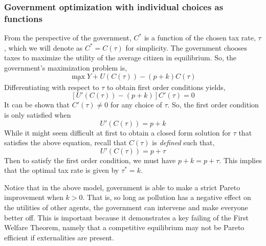 \subsubsection*{Government optimization with individual choices as functions}
From the perspective of the government, $C^*$ is a function of the chosen tax rate, $\tau$, which we will denote as $C^* = C(\tau)$ for simplicity. The government chooses taxes to maximize the utility of the average citizen in equilibrium. So, the government's maximization problem is,
\begin{equation*}
    \max_{\tau} Y + U(C(\tau)) - (p + k) C(\tau)
\end{equation*}
Differentiating with respect to $\tau$ to obtain first order conditions yields,
\begin{equation*}
    \left[U'(C(\tau)) - (p + k)\right]C'(\tau) = 0
\end{equation*}
It can be shown that $C'(\tau) \neq 0$ for any choice of $\tau$. So, the first order condition is only satisfied when
\begin{equation*}
    U'(C(\tau)) = p + k
\end{equation*}
While it might seem difficult at first to obtain a closed form solution for $\tau$ that satisfies the above equation, recall that $C(\tau)$ is \emph{defined} such that,
\begin{equation*}
    U'(C(\tau)) = p + \tau
\end{equation*}
Then to satisfy the first order condition, we must have $p + k = p + \tau$. This implies that the optimal tax rate is given by $\tau^* = k$. 

Notice that in the above model, government is able to make a strict Pareto improvement when $k > 0$. That is, so long as pollution has a negative effect on the utilities of other agents, the government can intervene and make everyone better off. This is important because it demonstrates a key failing of the First Welfare Theorem, namely that a competitive equilibrium may not be Pareto efficient if externalities are present. 

